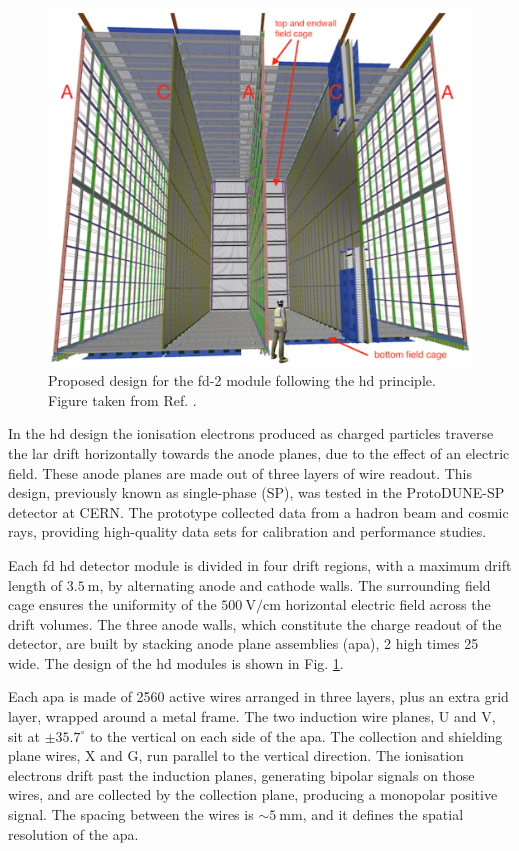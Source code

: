 \begin{figure}[t]
	\centering
	\includegraphics[width=0.65\linewidth]{Images/DUNE/FD/dune_hd}
	\caption[Proposed design for the \gls{fd}-2 module following the \gls{hd} principle.]{Proposed design for the \gls{fd}-2 module following the \gls{hd} principle. Figure taken from Ref. \cite{DUNE2020TDR1}.}
	\label{fig:dune_hd}
\end{figure}

In the \gls{hd} design the ionisation electrons produced as charged particles traverse the \gls{lar} drift horizontally towards the anode planes, due to the effect of an electric field. These anode planes are made out of three layers of wire readout. This design, previously known as single-phase (SP), was tested in the ProtoDUNE-SP detector at CERN. The prototype collected data from a hadron beam and cosmic rays, providing high-quality data sets for calibration and performance studies.

Each \gls{fd} \gls{hd} detector module is divided in four drift regions, with a maximum drift length of $3.5~\mathrm{m}$, by alternating anode and cathode walls. The surrounding field cage ensures the uniformity of the $500~\mathrm{V/cm}$ horizontal electric field across the drift volumes. The three anode walls, which constitute the charge readout of the detector, are built by stacking anode plane assemblies (\gls{apa}), 2 high times 25 wide. The design of the \gls{hd} modules is shown in Fig. \ref{fig:dune_hd}.

Each \gls{apa} is made of 2560 active wires arranged in three layers, plus an extra grid layer, wrapped around a metal frame. The two induction wire planes, U and V, sit at $\pm 35.7^{\circ}$ to the vertical on each side of the \gls{apa}. The collection and shielding plane wires, X and G, run parallel to the vertical direction. The ionisation electrons drift past the induction planes, generating bipolar signals on those wires, and are collected by the collection plane, producing a monopolar positive signal. The spacing between the wires is $\sim 5~\mathrm{mm}$, and it defines the spatial resolution of the \gls{apa}.

